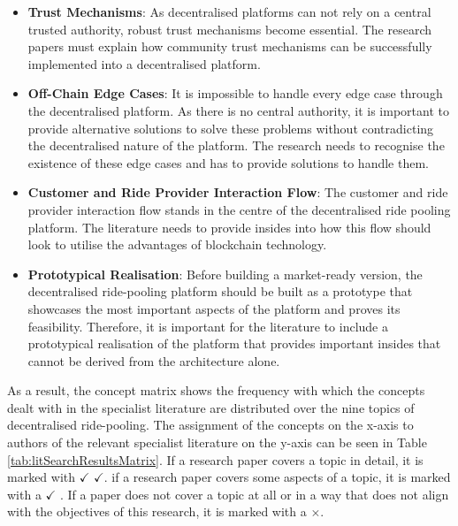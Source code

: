 \begin{itemize}
    \item \textbf{Trust Mechanisms}: As decentralised platforms can not rely on a central trusted authority, robust trust mechanisms become essential. The research papers must explain how community trust mechanisms can be successfully implemented into a decentralised platform.
    
    \item \textbf{Off-Chain Edge Cases}: It is impossible to handle every edge case through the decentralised platform. As there is no central authority, it is important to provide alternative solutions to solve these problems without contradicting the decentralised nature of the platform. The research needs to recognise the existence of these edge cases and has to provide solutions to handle them.
    
    \item \textbf{Customer and Ride Provider Interaction Flow}: The customer and ride provider interaction flow stands in the centre of the decentralised ride pooling platform. The literature needs to provide insides into how this flow should look to utilise the advantages of blockchain technology.
    
    \item \textbf{Prototypical Realisation}: Before building a market-ready version, the decentralised ride-pooling platform should be built as a prototype that showcases the most important aspects of the platform and proves its feasibility. Therefore, it is important for the literature to include a prototypical realisation of the platform that provides important insides that cannot be derived from the architecture alone.
\end{itemize}


As a result, the concept matrix shows the frequency with which the concepts dealt with in the specialist literature are distributed over the nine topics of decentralised ride-pooling. The assignment of the concepts on the x-axis to authors of the relevant specialist literature on the y-axis can be seen in Table \ref{tab:litSearchResultsMatrix}. If a research paper covers a topic in detail, it is marked with $\checkmark$ $\checkmark$. if a research paper covers some aspects of a topic, it is marked with a $\checkmark$ . If a paper does not cover a topic at all or in a way that does not align with the objectives of this research, it is marked with a $\times$. 



